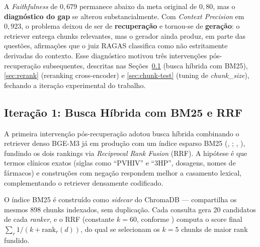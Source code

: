 \documentclass[
  12pt,
  oneside,
  a4paper,
  english,
  brazil
]{abntex2}
\begin{document}
A \textit{Faithfulness} de $0{,}679$ permanece abaixo da meta original de
$0{,}80$, mas o \textbf{diagnóstico do gap} se alterou substancialmente. Com
\textit{Context Precision} em $0{,}923$, o problema deixou de ser de
\textbf{recuperação} e tornou-se de \textbf{geração}: o retriever
entrega chunks relevantes, mas o gerador ainda produz, em parte das
questões, afirmações que o juiz RAGAS classifica como não estritamente
derivadas do contexto. Esse diagnóstico motivou três intervenções
pós-recuperação subsequentes, descritas nas Seções~\ref{sec:hybrid}
(busca híbrida com BM25), \ref{sec:rerank} (reranking
cross-encoder) e \ref{sec:chunk-test} (tuning de \textit{chunk\_size}),
fechando a iteração experimental do trabalho.

\subsection{Iteração 1: Busca Híbrida com BM25 e RRF}
\label{sec:hybrid}

A primeira intervenção pós-recuperação adotou busca híbrida combinando o
retriever denso BGE-M3 já em produção com um índice esparso BM25
(\citeauthor{cormack2009}, \citeyear{cormack2009}; \citeauthor{formal2021},
\citeyear{formal2021}), fundindo os dois rankings via
\textit{Reciprocal Rank Fusion} (RRF). A hipótese é que termos clínicos exatos
(siglas como ``PVHIV'' e ``3HP'', dosagens, nomes de fármacos) e construções
com negação respondem melhor a casamento lexical, complementando o
retriever densamente codificado.

O índice BM25 é construído como \textit{sidecar} do ChromaDB --- compartilha
os mesmos 898 chunks indexados, sem duplicação. Cada consulta gera
20 candidatos de cada \textit{ranker}, e o RRF (constante $k = 60$, conforme
\citeauthor{cormack2009}) computa o score final
$\sum_{r} 1 / (k + \text{rank}_r(d))$, do qual se selecionam os $k = 5$
chunks de maior rank fundido.
\end{document}
